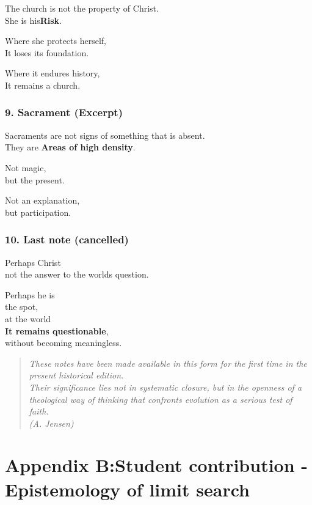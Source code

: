 \documentclass[
]{article}
\begin{document}
The church is not the property of Christ.\\
She is his\textbf{Risk}.

Where she protects herself,\\
It loses its foundation.

Where it endures history,\\
It remains a church.

\subsubsection{\texorpdfstring{\textbf{9. Sacrament (Excerpt)}}{9. Sacrament (Excerpt)}}\label{sacrament-excerpt}

Sacraments are not signs of something that is absent.\\
They are \textbf{Areas of high density}.

Not magic,\\
but the present.

Not an explanation,\\
but participation.

\subsubsection{\texorpdfstring{\textbf{10. Last note (cancelled)}}{10. Last note (cancelled)}}\label{last-note-cancelled}

Perhaps Christ\\
not the answer to the world\textquotesingle s question.

Perhaps he is\\
the spot,\\
at the world\\
\textbf{It remains questionable},\\
without becoming meaningless.

\begin{quote}
\emph{These notes have been made available in this form for the first time in the present historical edition.\\
Their significance lies not in systematic closure, but in the openness of a theological way of thinking that confronts evolution as a serious test of faith.\\
(A. Jensen)}
\end{quote}

\section{\texorpdfstring{Appendix B:\textbf{Student contribution -Epistemology of limit search} }{Appendix B:Student contribution -Epistemology of limit search }}\label{appendix-bstudent-contribution--epistemology-of-limit-search}
\end{document}
